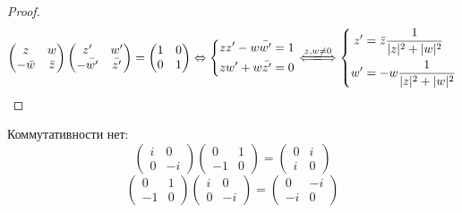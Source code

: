 \begin{proof}
$$\left(\begin{matrix}z & w \\ -\bar w & \bar z\end{matrix}\right)\left(\begin{matrix}z' & w' \\ -\bar{w'} & \bar{z'}\end{matrix}\right) = \left(\begin{matrix}1 & 0 \\ 0 & 1\end{matrix}\right) 
\Lra \left\{\begin{aligned}zz'-w\bar{w'} &= 1 \\ zw'+w\bar{z'} &= 0\end{aligned}\right.\xLongleftrightarrow{z, w \ne 0} \left\{\begin{aligned}z' &= \bar z\frac1{|z|^2+|w|^2} \\ w' &= -w\frac1{|z|^2+|w|^2}\end{aligned}\right.$$
\end{proof}

Коммутативности нет:
$$\left(\begin{matrix}i & 0 \\ 0 & -i\end{matrix}\right) \left(\begin{matrix}0 & 1 \\ -1 & 0\end{matrix}\right) = \left(\begin{matrix}0 & i \\ i & 0\end{matrix}\right)$$
$$\left(\begin{matrix}0 & 1 \\ -1 & 0\end{matrix}\right) \left(\begin{matrix}i & 0 \\ 0 & -i\end{matrix}\right) = \left(\begin{matrix}0 & -i \\ -i & 0\end{matrix}\right)$$
